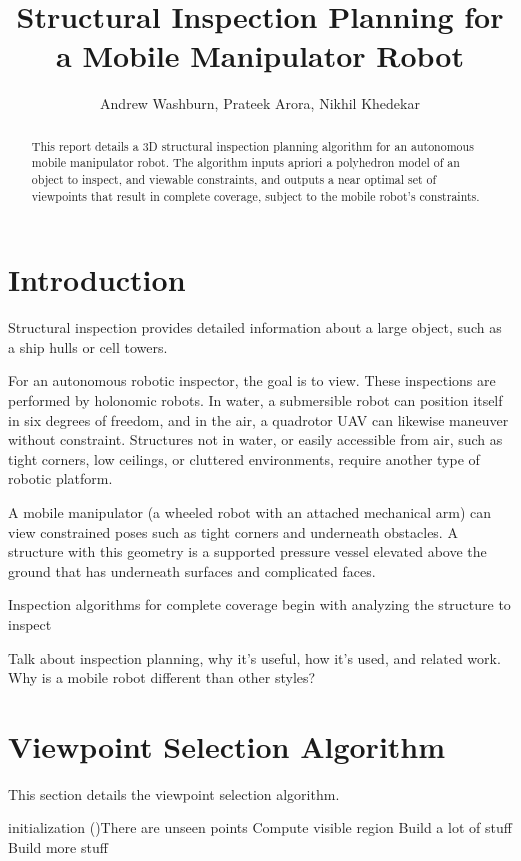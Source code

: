\documentclass{article}
\title{Structural Inspection Planning for a Mobile Manipulator Robot}
\author{Andrew Washburn, Prateek Arora, Nikhil Khedekar}
\begin{document}
\maketitle

\begin{multicols}{2}

\begin{abstract}
    This report details a 3D structural inspection planning algorithm for an autonomous mobile manipulator robot. The algorithm inputs apriori a polyhedron model of an object to inspect, and viewable constraints, and outputs a near optimal set of viewpoints that result in complete coverage, subject to the mobile robot's constraints. 
\end{abstract}

\section{Introduction}

Structural inspection provides detailed information about a large object, such as a ship hulls or cell towers.

For an autonomous robotic inspector, the goal is to view. These inspections are performed by holonomic robots. In water, a submersible robot can position itself in six degrees of freedom, and in the air, a quadrotor UAV can likewise maneuver without constraint. Structures not in water, or easily accessible from air, such as tight corners, low ceilings, or cluttered environments, require another type of robotic platform. 

A mobile manipulator (a wheeled robot with an attached mechanical arm) can view constrained poses such as tight corners and underneath obstacles. A structure with this geometry is a supported pressure vessel elevated above the ground that has underneath surfaces and complicated faces. 

Inspection algorithms for complete coverage begin with analyzing the structure to inspect \cite{latombe}

Talk about inspection planning, why it's useful, how it's used, and related work. Why is a mobile robot different than other styles?

\section{Viewpoint Selection Algorithm}

This section details the viewpoint selection algorithm.

\begin{algorithm}[H]
    \SetAlgoLined
    initialization\;
    \While(){There are unseen points}{
        Compute visible region\;
        Build a lot of stuff\;
        Build more stuff\;
    }
\end{algorithm}

\end{multicols}



\end{document}
